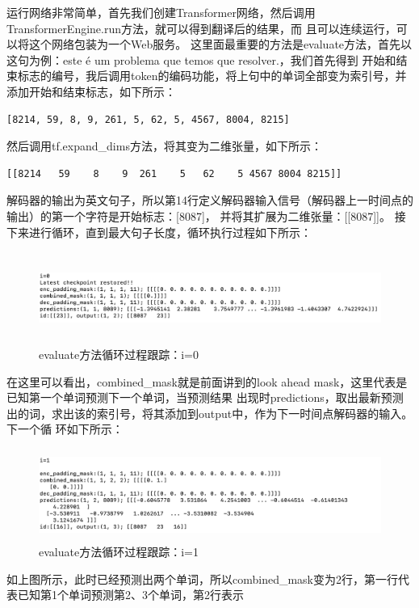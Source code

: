 \documentclass{article}
\begin{document}
运行网络非常简单，首先我们创建Transformer网络，然后调用TransformerEngine.run方法，就可以得到翻译后的结果，而
且可以连续运行，可以将这个网络包装为一个Web服务。\newline
这里面最重要的方法是evaluate方法，首先以这句为例：este é um problema que temos que resolver.，我们首先得到
开始和结束标志的编号，我后调用token的编码功能，将上句中的单词全部变为索引号，并添加开始和结束标志，如下所示：
\lstset{language=BASH}
\begin{lstlisting}
[8214, 59, 8, 9, 261, 5, 62, 5, 4567, 8004, 8215]
\end{lstlisting}
然后调用tf.expand\_dims方法，将其变为二维张量，如下所示：
\lstset{language=BASH}
\begin{lstlisting}
[[8214   59    8    9  261    5   62    5 4567 8004 8215]]
\end{lstlisting}
解码器的输出为英文句子，所以第14行定义解码器输入信号（解码器上一时间点的输出）的第一个字符是开始标志：[8087]，
并将其扩展为二维张量：[[8087]]。\newline
接下来进行循环，直到最大句子长度，循环执行过程如下所示：
\begin{figure}[H]
    \caption{evaluate方法循环过程跟踪：i=0}
    \label{f000088}
    \centering
    \includegraphics[height=3cm]{images/f000088}
\end{figure}
在这里可以看出，combined\_mask就是前面讲到的look ahead mask，这里代表是已知第一个单词预测下一个单词，当预测结果
出现时predictions，取出最新预测出的词，求出该的索引号，将其添加到output中，作为下一时间点解码器的输入。下一个循
环如下所示：
\begin{figure}[H]
    \caption{evaluate方法循环过程跟踪：i=1}
    \label{f000089}
    \centering
    \includegraphics[height=3cm]{images/f000089}
\end{figure}
如上图所示，此时已经预测出两个单词，所以combined\_mask变为2行，第一行代表已知第1个单词预测第2、3个单词，第2行表示
\end{document}
